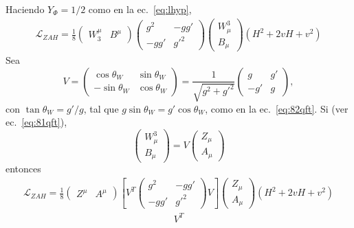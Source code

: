 \begin{frame}
Haciendo $Y_\Phi =1/2$ como en la ec.~\eqref{eq:lhyp},
\begin{align}
  \mathcal{L}_{ZAH}=\frac{1}{8}
  \begin{pmatrix}
    W^\mu_3 & B^\mu
  \end{pmatrix}
  \begin{pmatrix}
    g^2&-gg'\\
    -gg'&{g'}^2
  \end{pmatrix}
  \begin{pmatrix}
    W^3_\mu\\
    B_\mu
  \end{pmatrix}
\left(H^2+2vH+v^2\right)
\end{align}
Sea
\begin{equation}
  V=\begin{pmatrix}
    \cos\theta_W & \sin\theta_W\\
    -\sin\theta_W& \cos\theta_W
  \end{pmatrix}=
  \frac{1}{\sqrt{g^2+{g'}^2}}\begin{pmatrix}
    g   & g'\\
    -g' & g
  \end{pmatrix},
\end{equation}
con $\tan\theta_W=g'/g$, tal que $g\sin\theta_W=g'\cos\theta_W$, como en la ec.~\eqref{eq:82qft}. Si (ver ec.~\eqref{eq:81qft}),
\begin{equation}
  \begin{pmatrix}
    W^3_\mu\\
    B_\mu
  \end{pmatrix}=V
  \begin{pmatrix}
    Z_\mu\\
    A_\mu
  \end{pmatrix}
\end{equation}
entonces
\begin{align}
  \mathcal{L}_{ZAH}=\frac{1}{8}
  \begin{pmatrix}
    Z^\mu & A^\mu
  \end{pmatrix}\left[V^T
  \begin{pmatrix}
    g^2&-gg'\\
    -gg'&{g'}^2
  \end{pmatrix}V\right]
  \begin{pmatrix}
    Z_\mu\\
    A_\mu
  \end{pmatrix}
\left(H^2+2vH+v^2\right)
\end{align}
\begin{align}
  V^T

\end{align}
\end{frame}
